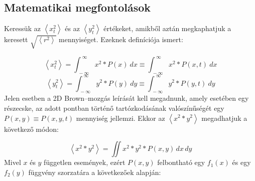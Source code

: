 \section{} \label{sec:1}

\subsection{Matematikai megfontolások}
Keressük az $\left< x_{t}^{2} \right>$ és az $\left< y_{t}^{2} \right>$ értékeket, amikből aztán megkaphatjuk a keresett $\sqrt{\left< r^{2} \right>}$ mennyiséget. Ezeknek definíciója ismert:

\begin{equation} \label{eq:1}
    \left< x_{t}^{2} \right>
    =
    \int_{\ -\infty}^{\ \infty} x^{2} * P \left( x \right)\ dx
    \equiv
    \int_{\ -\infty}^{\ \infty} x^{2} * P \left( x, t \right)\ dx
\end{equation}
\begin{equation} \label{eq:2}
    \left< y_{t}^{2} \right>
    =
    \int_{\ -\infty}^{\ \infty} y^{2} * P \left( y \right)\ dy
    \equiv
    \int_{\ -\infty}^{\ \infty} y^{2} * P \left( y, t \right)\ dy
\end{equation}
Jelen esetben a 2D Brown--mozgás leírását kell megadnunk, amely esetében egy részecske, az adott pontban történő tartózkodásának valószínűségét egy $P \left( x, y \right) \equiv P \left( x, y, t \right)$ mennyiség jellemzi. Ekkor az $\left< x^{2} * y^{2} \right>$ megadhatjuk a következő módon:

\begin{equation} \label{eq:3}
    \left< x^{2} * y^{2} \right>
    =
    \iint{x^{2} * y^{2} * P \left( x, y \right)\, dx\, dy}
\end{equation}
Mivel $x$ és $y$ független események, ezért $P \left( x, y \right)$ felbontható egy $f_{1} \left( x \right)$ és egy $f_{2} \left( y \right)$ függvény szorzatára a következőek alapján:

